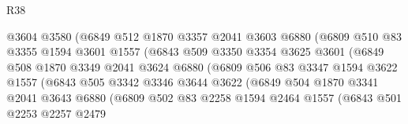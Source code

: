 \begin{lexlean}{R38}
\begin{coremodule}
                            @3604
                            @3580
                            (@6849
                              @512
                              @1870
                              @3357
                              @2041
                              @3603
                              @6880
                              (@6809
                                @510
                                @83
                                @3355
                                @1594
                                @3601
                                @1557
                                (@6843
                                  @509
                                  @3350
                                  @3354
                                  @3625
                                  @3601
                                  (@6849
                                    @508
                                    @1870
                                    @3349
                                    @2041
                                    @3624
                                    @6880
                                    (@6809
                                      @506
                                      @83
                                      @3347
                                      @1594
                                      @3622
                                      @1557
                                      (@6843
                                        @505
                                        @3342
                                        @3346
                                        @3644
                                        @3622
                                        (@6849
                                          @504
                                          @1870
                                          @3341
                                          @2041
                                          @3643
                                          @6880
                                          (@6809
                                            @502
                                            @83
                                            @2258
                                            @1594
                                            @2464
                                            @1557
                                            (@6843
                                              @501
                                              @2253
                                              @2257
                                              @2479

\end{coremodule}
\end{lexlean}
